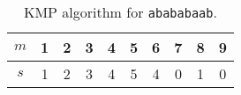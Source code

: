 \begin{table}[!ht]
    \centering
    \begin{tabular}{|c||c|c|c|c|c|c|c|c|c|}
        \hline
        $m$ & 1 & 2 & 3 & 4 & 5 & 6 & 7 & 8 & 9 \\
        \hline
        $s$ & 1 & 2 & 3 & 4 & 5 & 4 & 0 & 1 & 0 \\
        \hline
    \end{tabular}
    \caption{KMP algorithm for \texttt{abababaab}.}
    \label{tab:030406b}
\end{table}